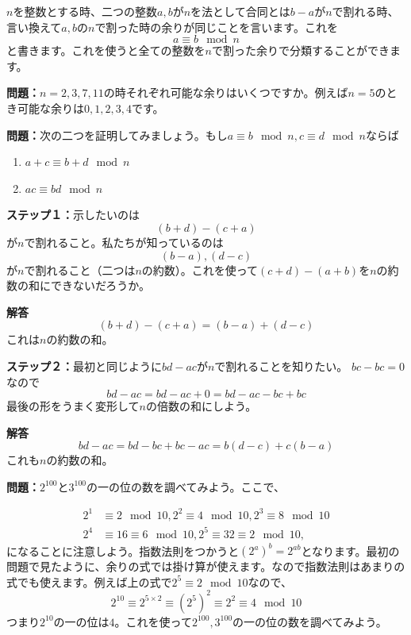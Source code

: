 \documentclass{ltjsarticle}
\begin{document}
$n$を整数とする時、二つの整数$a,b$が$n$を法として合同とは$b-a$が$n$で割れる時、言い換えて$a,b$の$n$で割った時の余りが同じことを言います。これを
\begin{equation*}
a\equiv b\mod{n}
\end{equation*}
と書きます。これを使うと全ての整数を$n$で割った余りで分類することができます。
\par\textbf{問題：}$n=2,3,7,11$の時それぞれ可能な余りはいくつですか。例えば$n=5$のとき可能な余りは$0,1,2,3,4$です。
\par\textbf{問題：}次の二つを証明してみましょう。もし$a\equiv b\mod{n},c\equiv d\mod{n}$ならば
\begin{enumerate}
\item $a+c\equiv b+d\mod{n}$
\item $ac \equiv bd\mod{n}$
\end{enumerate}

\par\textbf{ステップ１：}示したいのは
\begin{equation*}
(b+d)-(c+a)
\end{equation*}
が$n$で割れること。私たちが知っているのは
\begin{equation*}
(b-a),(d-c)
\end{equation*}
が$n$で割れること（二つは$n$の約数）。これを使って$(c+d)-(a+b)$を$n$の約数の和にできないだろうか。
\par\textbf{解答}\\
\begin{equation*}
(b+d)-(c+a) = (b-a)+(d-c)
\end{equation*}
これは$n$の約数の和。
\par\textbf{ステップ２：}最初と同じように$bd-ac$が$n$で割れることを知りたい。
$bc-bc = 0$なので
\begin{equation*}
bd-ac = bd-ac+0 = bd-ac -bc+bc
\end{equation*}
最後の形をうまく変形して$n$の倍数の和にしよう。
\par\textbf{解答}\\
\begin{equation*}
bd-ac = bd-bc+bc-ac = b(d-c)+c(b-a)
\end{equation*}
これも$n$の約数の和。
\par\textbf{問題：}$2^{100}$と$3^{100}$の一の位の数を調べてみよう。ここで、

\begin{align*}
2^1 &\equiv 2 \mod{10},2^2 \equiv 4 \mod{10},2^3 \equiv 8 \mod{10}\\
2^4 &\equiv 16 \equiv 6 \mod{10},2^5\equiv 32 \equiv 2 \mod{10},
\end{align*}
になることに注意しよう。指数法則をつかうと$(2^a)^b = 2^{ab}$となります。最初の問題で見たように、余りの式では掛け算が使えます。なので指数法則はあまりの式でも使えます。例えば上の式で$2^5\equiv 2\mod{10}$なので、
\begin{equation*}
2^{10} \equiv 2^{5\times 2} \equiv (2^5)^2 \equiv 2^2 \equiv 4 \mod{10}
\end{equation*}
つまり$2^{10}$の一の位は$4$。これを使って$2^{100},3^{100}$の一の位の数を調べてみよう。
\end{document}
